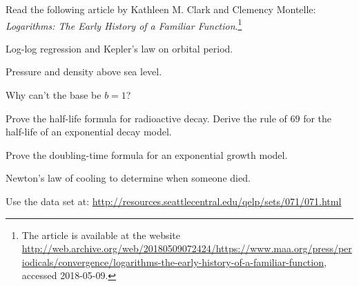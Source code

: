 \documentclass[a4paper,oneside,12pt]{article}
\begin{document}
\begin{problem}
\item Read the following article by Kathleen M. Clark and Clemency
  Montelle:
  \emph{Logarithms: The Early History of a Familiar Function}.\footnote{
    The article is available at the website
    \url{http://web.archive.org/web/20180509072424/https://www.maa.org/press/periodicals/convergence/logarithms-the-early-history-of-a-familiar-function},
    accessed 2018-05-09.
  }

\item Log-log regression and Kepler's law on orbital period.

\item Pressure and density above sea level.

\item Why can't the base be $b = 1$?

\item Prove the half-life formula for radioactive decay.  Derive the
  rule of $69$ for the half-life of an exponential decay model.

\item Prove the doubling-time formula for an exponential growth
  model.

\item Newton's law of cooling to determine when someone died.

\item Use the data set at:
  \url{http://resources.seattlecentral.edu/qelp/sets/071/071.html}
\end{problem}
\end{document}
